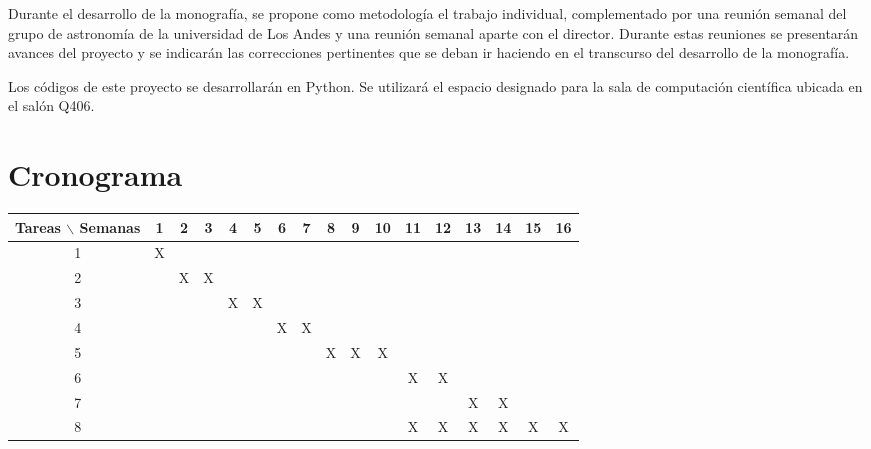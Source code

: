 \documentclass[12pt]{article}
\begin{document}


Durante el desarrollo de la monograf\'ia, se propone como
metodolog\'ia el trabajo individual, complementado por una reuni\'on
semanal del grupo de astronom\'ia de la universidad de Los Andes y una
reuni\'on semanal aparte con el director. Durante estas reuniones se
presentar\'an avances del proyecto y se indicar\'an las correcciones
pertinentes que se deban ir haciendo en el transcurso del desarrollo
de la monograf\'ia. 

Los c\'odigos de este proyecto se desarrollar\'an en Python.
Se utilizar\'a el espacio designado para la sala de computaci\'on
cient\'ifica ubicada en el sal\'on Q406. 




\section{Cronograma}

\begin{table}[htb]
	\begin{tabular}{|c|cccccccccccccccc| }
	\hline
	Tareas $\backslash$ Semanas & 1 & 2 & 3 & 4 & 5 & 6 & 7 & 8 & 9 & 10 & 11 & 12 & 13 & 14 & 15 & 16  \\
	\hline
	1 & X &   &   &   &   &   &   &   &   &   &   &   &   &   &   &   \\
	2 &   & X & X &   &   &   &   &   &   &   &   &   &   &   &   &   \\
	3 &   &   &   & X & X &   &   &   &   &   &   &   &   &   &   &   \\
	4 &   &   &   &   &   & X & X &   &   &   &   &   &   &   &   &   \\
	5 &   &   &   &   &   &   &   & X & X & X &   &   &   &   &   &   \\
	6 &   &   &   &   &   &   &   &   &   &   & X & X &   &   &   &   \\
	7 &   &   &   &   &   &   &   &   &   &   &   &   & X & X &   &   \\
	8 &   &   &   &   &   &   &   &   &   &   & X & X & X & X & X & X \\
	\hline
	\end{tabular}
\end{table}
\vspace{1mm}
\end{document}
